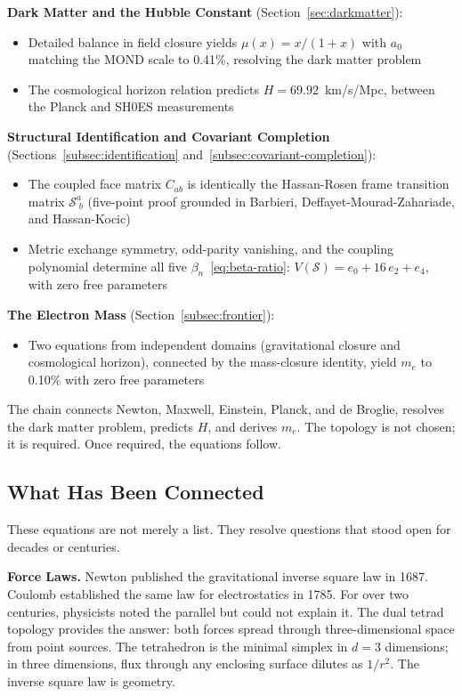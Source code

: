 \documentclass[aps,prd,preprint,superscriptaddress,showpacs,preprintnumbers,amsmath,amssymb,nofootinbib]{revtex4-2}
\begin{document}
\textbf{Dark Matter and the Hubble Constant} (Section~\ref{sec:darkmatter}):
\begin{itemize}
\item Detailed balance in field closure yields $\mu(x) = x/(1+x)$ with $a_0$ matching the MOND scale to 0.41\%, resolving the dark matter problem
\item The cosmological horizon relation predicts $H = 69.92$~km/s/Mpc, between the Planck and SH0ES measurements
\end{itemize}

\textbf{Structural Identification and Covariant Completion} (Sections~\ref{subsec:identification} and~\ref{subsec:covariant-completion}):
\begin{itemize}
\item The coupled face matrix $C_{ab}$ is identically the Hassan-Rosen frame transition matrix $\mathcal{S}^a_{\;b}$ (five-point proof grounded in Barbieri, Deffayet-Mourad-Zahariade, and Hassan-Kocic)
\item Metric exchange symmetry, odd-parity vanishing, and the coupling polynomial determine all five $\beta_n$~\eqref{eq:beta-ratio}: $V(\mathcal{S}) = e_0 + 16\,e_2 + e_4$, with zero free parameters
\end{itemize}

\textbf{The Electron Mass} (Section~\ref{subsec:frontier}):
\begin{itemize}
\item Two equations from independent domains (gravitational closure and cosmological horizon), connected by the mass-closure identity, yield $m_e$ to 0.10\% with zero free parameters
\end{itemize}

The chain connects Newton, Maxwell, Einstein, Planck, and de Broglie, resolves the dark matter problem, predicts $H$, and derives $m_e$. The topology is not chosen; it is required. Once required, the equations follow.

\subsection{What Has Been Connected}
\label{subsec:connections}

These equations are not merely a list. They resolve questions that stood open for decades or centuries.

\textbf{Force Laws.} Newton published the gravitational inverse square law in 1687. Coulomb established the same law for electrostatics in 1785. For over two centuries, physicists noted the parallel but could not explain it. The dual tetrad topology provides the answer: both forces spread through three-dimensional space from point sources. The tetrahedron is the minimal simplex in $d = 3$ dimensions; in three dimensions, flux through any enclosing surface dilutes as $1/r^2$. The inverse square law is geometry.
\end{document}
